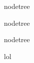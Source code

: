 \documentclass{article}
\begin{document}
\begin{NodetreeEmbed}
nodetree
\end{NodetreeEmbed}

\begin{NodetreeEmbed}
nodetree
\end{NodetreeEmbed}

\begin{NodetreeEmbed}
nodetree
\end{NodetreeEmbed}

lol
\end{document}
